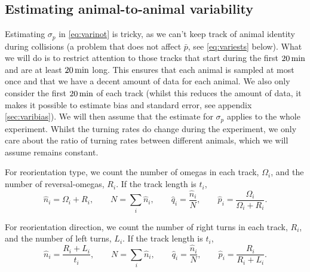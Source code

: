 \documentclass[12pt]{article}
\begin{document}
\subsection{Estimating animal-to-animal variability}\label{sec:variest}

Estimating $\sigma_p$ in \eqref{eq:varinot} is tricky, as we can't keep track of animal identity during collisions (a problem that does not affect $\bar{p}$, see \eqref{eq:variests} below). What we will do is to restrict attention to those tracks that start during the first $20\,\mathrm{min}$ and are at least $20\,\mathrm{min}$ long. This ensures that each animal is sampled at most once and that we have a decent amount of data for each animal. We also only consider the first $20\,\mathrm{min}$ of each track (whilst this reduces the amount of data, it makes it possible to estimate bias and standard error, see appendix \ref{sec:varibias}). We will then assume that the estimate for $\sigma_p$ applies to the whole experiment. Whilst the turning rates do change during the experiment, we only care about the ratio of turning rates between different animals, which we will assume remains constant.

For reorientation type, we count the number of omegas in each track, $\Omega_i$, and the number of reversal-omegas, $R_i$. If the track length is $t_i$,
%
\begin{equation}\label{eq:varesttype}
  \hat{n}_i = \Omega_i+R_i, \qquad
  N = \sum_i \hat{n}_i, \qquad
  \hat{q}_i = \frac{\hat{n}_i}{N}, \qquad
  \hat{p}_i = \frac{\Omega_i}{\Omega_i+R_i}.
\end{equation}
%

For reorientation direction, we count the number of right turns in each track, $R_i$, and the number of left turns, $L_i$. If the track length is $t_i$,
%
\begin{equation}\label{eq:varestdir}
  \hat{n}_i = \frac{R_i+L_i}{t_i}, \qquad
  N = \sum_i \hat{n}_i, \qquad
  \hat{q}_i = \frac{\hat{n}_i}{N}, \qquad
  \hat{p}_i = \frac{R_i}{R_i+L_i}.
\end{equation}
%
\end{document}
